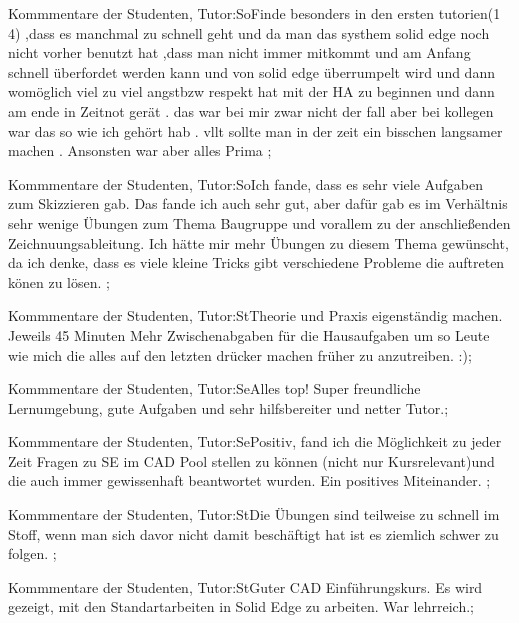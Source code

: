 \documentclass[10pt]{beamer}
\begin{document}
\begin{frame}[fragile]{Kommmentare der Studenten, Tutor:So}Finde besonders in den ersten tutorien(1 4) ,dass es manchmal zu schnell geht und da man das systhem solid edge noch nicht vorher benutzt hat ,dass man nicht immer mitkommt und am Anfang schnell überfordet werden kann und von solid edge überrumpelt wird und dann womöglich viel zu viel angstbzw respekt  hat mit der HA zu beginnen und dann am ende in Zeitnot gerät . das war bei mir zwar nicht der fall aber bei kollegen war das so wie ich gehört hab . vllt sollte man in der zeit ein bisschen langsamer machen . Ansonsten war aber alles Prima ;
 \end{frame}
\begin{frame}[fragile]{Kommmentare der Studenten, Tutor:So}Ich fande, dass es sehr viele Aufgaben zum Skizzieren gab. Das fande ich auch sehr gut, aber dafür gab es im Verhältnis sehr wenige Übungen zum Thema Baugruppe und vorallem zu der anschließenden Zeichnuungsableitung. Ich hätte mir mehr Übungen zu diesem Thema gewünscht, da ich denke, dass es viele kleine Tricks gibt verschiedene Probleme die auftreten könen zu lösen. ;
 \end{frame}
\begin{frame}[fragile]{Kommmentare der Studenten, Tutor:St}Theorie und Praxis eigenständig machen.  Jeweils 45 Minuten   Mehr Zwischenabgaben für die Hausaufgaben um so Leute wie mich die alles auf den letzten drücker machen früher zu anzutreiben. :);
 \end{frame}
\begin{frame}[fragile]{Kommmentare der Studenten, Tutor:Se}Alles top! Super freundliche Lernumgebung, gute Aufgaben und sehr hilfsbereiter und netter Tutor.;
 \end{frame}
\begin{frame}[fragile]{Kommmentare der Studenten, Tutor:Se}Positiv, fand ich die Möglichkeit zu jeder Zeit Fragen zu SE im CAD Pool stellen zu können (nicht nur Kursrelevant)und die auch immer gewissenhaft beantwortet wurden.
 Ein positives Miteinander. ;
 \end{frame}
\begin{frame}[fragile]{Kommmentare der Studenten, Tutor:St}Die Übungen sind teilweise zu schnell im Stoff, wenn man sich davor nicht damit beschäftigt hat ist es ziemlich schwer zu folgen. ;
 \end{frame}
\begin{frame}[fragile]{Kommmentare der Studenten, Tutor:St}Guter CAD Einführungskurs. Es wird gezeigt, mit den Standartarbeiten in Solid Edge zu arbeiten. War lehrreich.;
 \end{frame}
\end{document}
